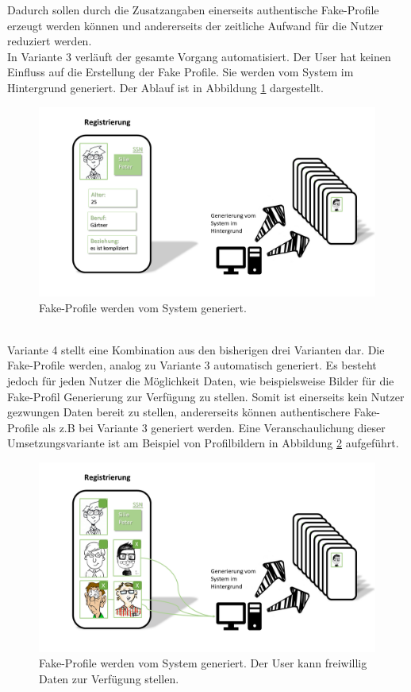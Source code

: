 \documentclass{sigchi}
\begin{document}
Dadurch sollen durch die Zusatzangaben einerseits authentische Fake-Profile erzeugt werden können und andererseits der zeitliche Aufwand für die Nutzer reduziert werden. \\
In Variante 3 verläuft der gesamte Vorgang automatisiert. Der User hat keinen Einfluss auf die Erstellung der Fake Profile. Sie werden vom System im Hintergrund generiert. Der Ablauf ist in Abbildung \ref{fig:Umsetzung3} dargestellt.
\begin{figure}[htbp]
	\includegraphics[width=0.8\columnwidth]{figures/Umsetzung3.PNG}
	\caption{Fake-Profile werden vom System generiert.}
	\label{fig:Umsetzung3}
\end{figure}
\\
Variante 4 stellt eine Kombination aus den bisherigen drei Varianten dar. Die Fake-Profile werden, analog zu Variante 3 automatisch generiert. Es besteht jedoch für jeden Nutzer die Möglichkeit Daten, wie beispielsweise Bilder für die Fake-Profil Generierung zur Verfügung zu stellen. Somit ist einerseits kein Nutzer gezwungen Daten bereit zu stellen, andererseits können authentischere Fake-Profile als z.B bei Variante 3 generiert werden. Eine Veranschaulichung dieser Umsetzungsvariante ist am Beispiel von Profilbildern in Abbildung \ref{fig:Umsetzung4} aufgeführt. 
\begin{figure}[htbp]
	\includegraphics[width=\columnwidth]{figures/Umsetzung4.PNG}
	\caption{Fake-Profile werden vom System generiert. Der User kann freiwillig Daten zur Verfügung stellen.}
	\label{fig:Umsetzung4}
\end{figure}
\end{document}
